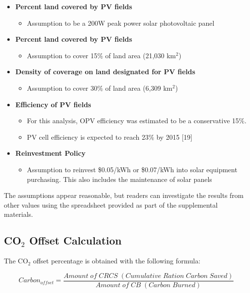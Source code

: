 \documentclass[11pt]{article}
\begin{document}
\begin{itemize}
\item {\bf Percent land covered by PV fields}
\begin{itemize}
\item Assumption to be a 200W peak power solar photovoltaic panel
\end{itemize}
\item {\bf Percent land covered by PV fields}
\begin{itemize}
\item Assumption to cover 15\% of land area (21,030 km$^2$)
\end{itemize}
\item {\bf Density of coverage on land designated for PV fields}
\begin{itemize}
\item  Assumption to cover 30\% of land area (6,309 km$^2$)
\end{itemize}
\item {\bf Efficiency of PV fields}
\begin{itemize}
\item For this analysis, OPV efficiency was estimated to be a conservative 15\%.
\item PV cell efficiency is expected to reach 23\% by 2015 [19]
\end{itemize}
\item {\bf Reinvestment Policy}
\begin{itemize}
\item Assumption to reinvest \$0.05/kWh or \$0.07/kWh into solar equipment purchasing. This  also includes the maintenance of solar panels
\end{itemize}
\end{itemize}

The assumptions appear reasonable, but readers can investigate the results from other values using the spreadsheet provided as part of the supplemental materials. 

\subsection{CO$_2$ Offset Calculation}

The CO$_2$ offset percentage is obtained with the following formula:

\begin{displaymath}
Carbon_{offset} = \frac{Amount \;of\; CRCS \;(Cumulative \;Ration \;Carbon \;Saved)}{Amount \;of \;CB \;(Carbon\; Burned)}
\end{displaymath}
\end{document}
